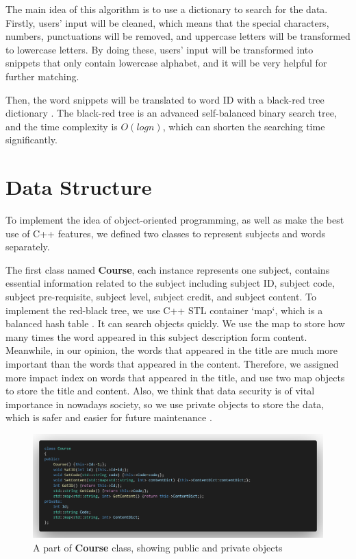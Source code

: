 \documentclass[manuscript,screen,review,12pt]{acmart}
\begin{document}
The main idea of this algorithm is to use a dictionary to search for the data. Firstly, users' input will be cleaned, which means that the special characters, numbers, punctuations will be removed, and uppercase letters will be transformed to lowercase letters. By doing these, users' input will be transformed into snippets that only contain lowercase alphabet, and it will be very helpful for further matching.

Then, the word snippets will be translated to word ID with a black-red tree dictionary \cite{li2004memory}. The black-red tree is an advanced self-balanced binary search tree, and the time complexity is $O(log n)$, which can shorten the searching time significantly. 

\section{Data Structure}

To implement the idea of object-oriented programming, as well as make the best use of C++ features, we defined two classes to represent subjects and words separately. 

The first class named \textbf{Course}, each instance represents one subject, contains essential information related to the subject including subject ID, subject code, subject pre-requisite, subject level, subject credit, and subject content. To implement the red-black tree, we use C++ STL container `map`, which is a balanced hash table \cite{das2008speeding}. It can search objects quickly. We use the map to store how many times the word appeared in this subject description form content. Meanwhile, in our opinion, the words that appeared in the title are much more important than the words that appeared in the content. Therefore, we assigned more impact index on words that appeared in the title, and use two map objects to store the title and content. Also, we think that data security is of vital importance in nowadays society, so we use private objects to store the data, which is safer and easier for future maintenance \cite{oualline2003practical,shaffer1997practical}. 

\begin{figure}[h]
  \centering
  \includegraphics[width=\linewidth]{simplifiedcourse.png}
  \caption{A part of \textbf{Course} class, showing public and private objects}
\end{figure}
\end{document}
